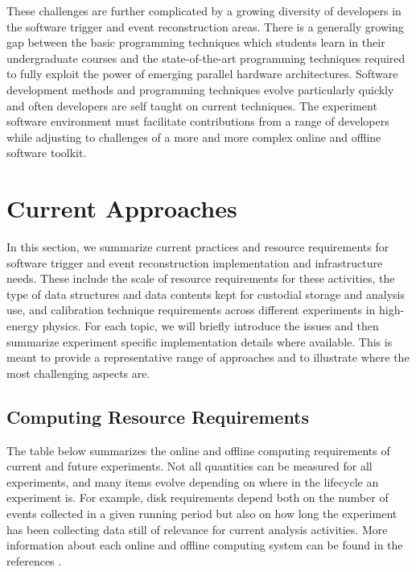 These challenges are further complicated by a growing diversity of developers in the software trigger and event reconstruction areas. There is a generally growing gap between the basic 
programming techniques which students learn in their undergraduate courses and the state-of-the-art programming techniques required to fully exploit the power of emerging parallel hardware 
architectures. Software development methods and programming techniques evolve particularly quickly and often developers are self taught on current techniques. The experiment software environment 
must facilitate contributions from a range of developers while adjusting to challenges of a more and more complex online and offline software toolkit.

\section{Current Approaches}

In this section, we summarize current practices and resource requirements for software trigger and event reconstruction implementation and infrastructure needs. These include the scale of resource 
requirements for these activities, the type of data structures and data contents kept for custodial storage and analysis use, and calibration technique requirements across different experiments in 
high-energy physics. For each topic, we will briefly introduce the issues and then summarize experiment specific implementation details where available. This is meant to provide a representative 
range of approaches and to illustrate where the most challenging aspects are.

\subsection{Computing Resource Requirements}

The table below summarizes the online and offline computing requirements of current and future experiments. Not all quantities can be measured for all experiments, and many items evolve depending 
on where in the lifecycle an experiment is. For example, disk requirements depend both on the number of events collected in a given running period but also on how long the experiment has been 
collecting data still of relevance for current analysis activities. More information about each online and offline computing system can be found in the 
references \cite{ALICE2015, Allton2017, ATLAS2015, CMS2015, DUNE2015, DUNE2017, LHCb2017, Miyamoto2015, Richter2016}.

